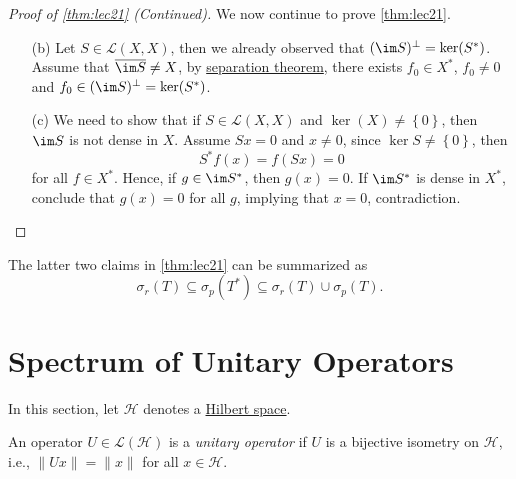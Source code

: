 \begin{proof}[Proof of \autoref{thm:lec21} (Continued)]
	We now continue to prove \autoref{thm:lec21}.
	\begin{enumerate}
		\item[(b)] Let \(S\in \mathcal{L} (X, X)\), then we already observed that \((\im S)^{\perp} = \ker(S^{\ast} )\). Assume that \(\overline{\im S} \neq X\), by \hyperref[thm:separation-of-convex-sets]{separation theorem}, there exists \(f_0\in X^{\ast} \), \(f_0 \neq 0\) and \(f_0 \in (\im S)^{\perp} = \ker(S^{\ast} )\).
		\item[(c)] We need to show that if \(S\in \mathcal{L} (X, X)\) and \(\ker(X) \neq \left\{ 0 \right\} \), then \(\im S\) is not dense in \(X\). Assume \(Sx = 0\) and \(x \neq 0\), since \(\ker S \neq \left\{ 0 \right\} \), then
		      \[
			      S^{\ast} f(x) = f(Sx) = 0
		      \]
		      for all \(f\in X^{\ast} \). Hence, if \(g\in \im S^{\ast} \), then \(g(x) = 0\). If \(\im S^{\ast} \) is dense in \(X^{\ast} \), conclude that \(g(x) = 0\) for all \(g\), implying that \(x = 0\), contradiction.
	\end{enumerate}
\end{proof}

\begin{remark}
	The latter two claims in \autoref{thm:lec21} can be summarized as
	\[
		\sigma _r(T) \subseteq \sigma _p(T^{\ast} ) \subseteq \sigma _r(T) \cup \sigma _p(T).
	\]
\end{remark}

\section{Spectrum of Unitary Operators}
In this section, let \(\mathcal{H} \) denotes a \hyperref[def:Hilbert-space]{Hilbert space}.

\begin{prev}
	An operator \(U\in \mathcal{L} (\mathcal{H} )\) is a \emph{unitary operator} if \(U\) is a bijective isometry on \(\mathcal{H} \), i.e., \(\lVert Ux \rVert = \lVert x \rVert \) for all \(x\in \mathcal{H} \).
\end{prev}

